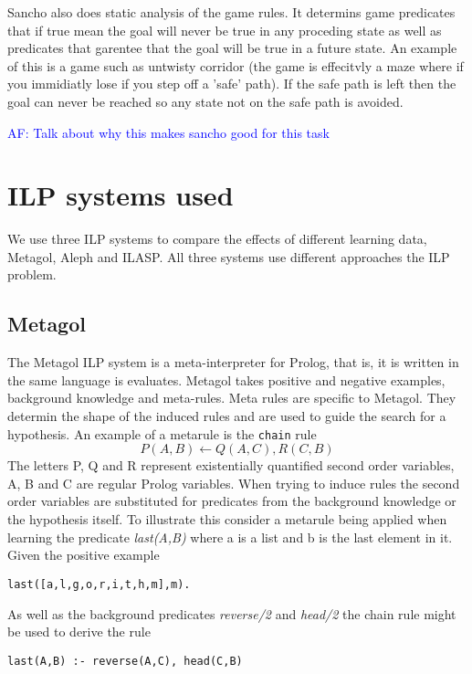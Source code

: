 \documentclass[a4paper,10pt]{report}
\newcommand{\af}[1]{\textcolor{blue}{AF: #1}}
\begin{document}
Sancho also does static analysis of the game rules. It determins game predicates that if true mean the goal will never be true in any proceding state as well as predicates that garentee that the goal will be true in a future state. An example of this is a game such as untwisty corridor (the game is effecitvly a maze where if you immidiatly lose if you step off a 'safe' path). If the safe path is left then the goal can never be reached so any state not on the safe path is avoided.

\af{Talk about why this makes sancho good for this task}
\chapter{ILP systems used}
We use three ILP systems to compare the effects of different learning data, Metagol, Aleph and ILASP. All three systems use different approaches the ILP problem.
\section{Metagol}
The Metagol ILP system is a meta-interpreter for Prolog, that is, it is written in the same language is evaluates. Metagol takes positive and negative examples, background knowledge and meta-rules. Meta rules are specific to Metagol. They determin the shape of the induced rules and are used to guide the search for a hypothesis. An example of a metarule is the \texttt{chain} rule \[P(A,B) \leftarrow Q(A,C),R(C,B)\] The letters P, Q and R represent existentially quantified second order variables, A, B and C are regular Prolog variables. When trying to induce rules the second order variables are substituted for predicates from the background knowledge or the hypothesis itself. To illustrate this consider a metarule being applied when learning the predicate \textit{last(A,B)} where a is a list and b is the last element in it. Given the positive example 
\begin{verbatim}
last([a,l,g,o,r,i,t,h,m],m).
\end{verbatim}  

As well as the background predicates \textit{reverse/2} and \textit{head/2} the chain rule might be used to derive the rule 
\begin{verbatim}
last(A,B) :- reverse(A,C), head(C,B)
\end{verbatim}
\end{document}
